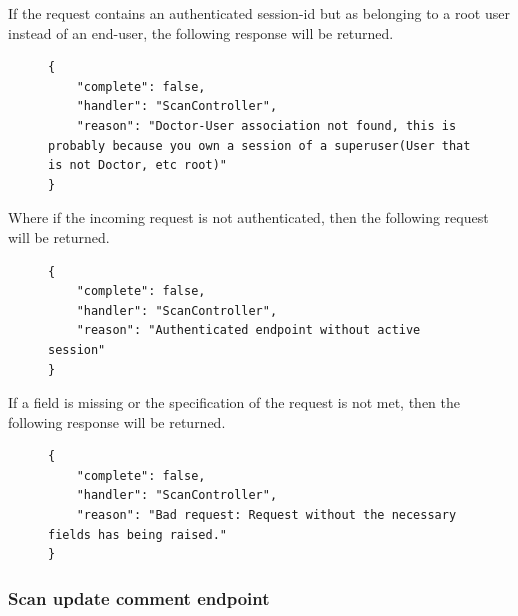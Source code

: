 					If the request contains an authenticated session-id but as belonging to a root user instead of an end-user, the following response will be returned.
					\begin{figure}[H]
						\iftrue
						\begin{lstlisting}[]
{
	"complete": false,
	"handler": "ScanController",
	"reason": "Doctor-User association not found, this is probably because you own a session of a superuser(User that is not Doctor, etc root)"
}
						\end{lstlisting}
					\end{figure}
					Where if the incoming request is not authenticated, then the following request will be returned.
					\begin{figure}[H]
						\iftrue
						\begin{lstlisting}[]
{
	"complete": false,
	"handler": "ScanController",
	"reason": "Authenticated endpoint without active session"
}
						\end{lstlisting}
					\end{figure}
					If a field is missing or the specification of the request is not met, then the following response will be returned.
					\begin{figure}[H]
						\iftrue
						\begin{lstlisting}[]
{
	"complete": false,
	"handler": "ScanController",
	"reason": "Bad request: Request without the necessary fields has being raised."
}					
						\end{lstlisting}
					\end{figure}
				\subsubsection{Scan update comment endpoint}
					
